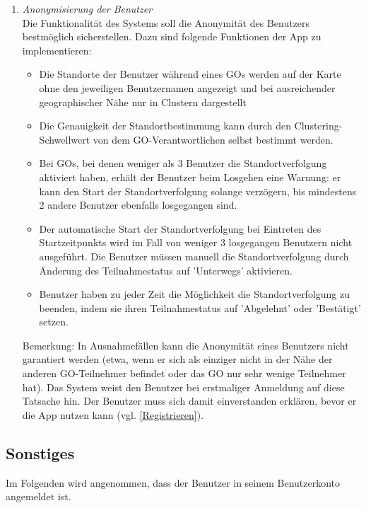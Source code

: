 \documentclass[parskip=full]{scrartcl}
\def\threedigits#1{%
  \ifnum#1<100 0\fi
  \ifnum#1<10 0\fi
  \number#1}
\begin{document}
\begin{enumerate}[label={\textbf{/F\protect\threedigits{\theenumi}0/}}, leftmargin=*, resume]
\item \textit{Anonymisierung der Benutzer}\label{Anonymisierung} \\ Die Funktionalität des Systems soll die Anonymität des Benutzers bestmöglich sicherstellen. Dazu sind folgende Funktionen der App zu implementieren:
		\begin{itemize}
			\item Die Standorte der Benutzer während eines GOs werden auf der Karte ohne den jeweiligen Benutzernamen angezeigt und bei ausreichender geographischer Nähe nur in Clustern dargestellt
			\item \colorbox{shadecolor}{\parbox{0.85\textwidth}{Die Genauigkeit der Standortbestimmung kann durch den Clustering-Schwellwert von dem GO-Verantwortlichen selbst bestimmt werden.}}
			\item \colorbox{shadecolor}{\parbox{.85\textwidth}{Bei GOs, bei denen weniger als 3 Benutzer die Standortverfolgung aktiviert haben, erhält der Benutzer beim Losgehen eine Warnung: er kann den Start der Standortverfolgung solange verzögern, bis mindestens 2 andere Benutzer ebenfalls losgegangen sind.}}
			\item Der automatische Start der Standortverfolgung bei Eintreten des Startzeitpunkts wird im Fall von weniger 3 losgegangen Benutzern nicht ausgeführt. Die Benutzer müssen manuell die Standortverfolgung durch Änderung des Teilnahmestatus auf 'Unterwegs' aktivieren.
			\item Benutzer haben zu jeder Zeit die Möglichkeit die Standortverfolgung zu beenden, indem sie ihren Teilnahmestatus auf 'Abgelehnt' oder 'Bestätigt' setzen.
		\end{itemize}
		Bemerkung: In Ausnahmefällen kann die Anonymität eines Benutzers nicht garantiert werden (etwa, wenn er sich als einziger nicht in der Nähe der anderen GO-Teilnehmer befindet oder das GO nur sehr wenige Teilnehmer hat). Das System weist den Benutzer bei erstmaliger Anmeldung auf diese Tatsache hin. Der Benutzer muss sich damit einverstanden erklären, bevor er die App nutzen kann (vgl. \ref{Registrieren}).
		
\end{enumerate}

\subsection{Sonstiges}
Im Folgenden wird angenommen, dass der Benutzer in seinem Benutzerkonto angemeldet ist.
\end{document}
